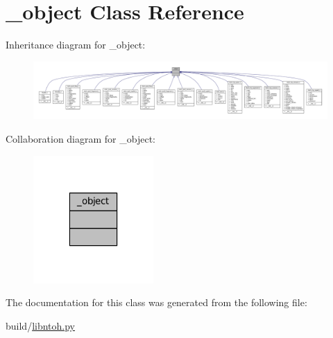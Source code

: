 \hypertarget{classlibntoh_1_1__object}{\section{\-\_\-object Class Reference}
\label{classlibntoh_1_1__object}
}


Inheritance diagram for \-\_\-object\-:
\nopagebreak
\begin{figure}[H]
\begin{center}
\leavevmode
\includegraphics[width=350pt]{classlibntoh_1_1__object__inherit__graph}
\end{center}
\end{figure}


Collaboration diagram for \-\_\-object\-:
\nopagebreak
\begin{figure}[H]
\begin{center}
\leavevmode
\includegraphics[width=130pt]{classlibntoh_1_1__object__coll__graph}
\end{center}
\end{figure}


The documentation for this class was generated from the following file\-:\begin{DoxyCompactItemize}
\item 
build/\hyperlink{libntoh_8py}{libntoh.\-py}\end{DoxyCompactItemize}
